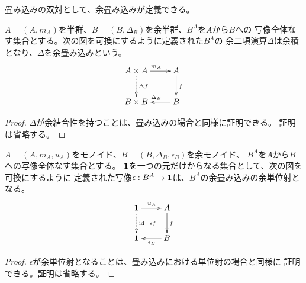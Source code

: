 		畳み込みの双対として、余畳み込みが定義できる。

		\begin{definition}\label{def:余畳み込み} %
			$A=(A,m_A)$を半群、$B=(B,\Delta_B)$を余半群、$B^A$を$A$から$B$への
			写像全体なす集合とする。次の図を可換にするように定義された$B^A$の
			余二項演算$\Delta$は余積となり、$\Delta$を余畳み込みという。
			\begin{equation}\xymatrix{ %
				A \times A \ar@{.>}[d]^{\Delta f} \ar[r]^{m_A} & A \ar[d]^{f} \\
				B \times B & B \ar[l]_{\Delta_B} \\
			}\end{equation} %
		\end{definition} %
		\begin{proof} %
			$\Delta$が余結合性を持つことは、畳み込みの場合と同様に証明できる。
			証明は省略する。
		\end{proof} %

		\begin{proposition}[余畳み込みの単位射]\label{prop:余畳み込みの単位射} %
			$A=(A,m_A,u_A)$をモノイド、$B=(B,\Delta_B,\epsilon_B)$を余モノイド、
			$B^A$を$A$から$B$への写像全体なす集合とする。
			${\mathbf{1}}$を一つの元だけからなる集合として、次の図を可換にするように
			定義された写像$\epsilon:B^A\to {\mathbf{1}}$は、$B^A$の余畳み込みの余単位射となる。
			\begin{equation}\xymatrix{
				\mybf{1} \ar@{.>}[d]^{\myid=\epsilon f} \ar[r]^{u_A} & A \ar[d]^{f} \\
				\mybf{1} & B \ar[l]^{\epsilon_B} \\
			}\end{equation}
		\end{proposition} %
		\begin{proof} %
			$\epsilon$が余単位射となることは、畳み込みにおける単位射の場合と同様に
			証明できる。証明は省略する。
		\end{proof} %

